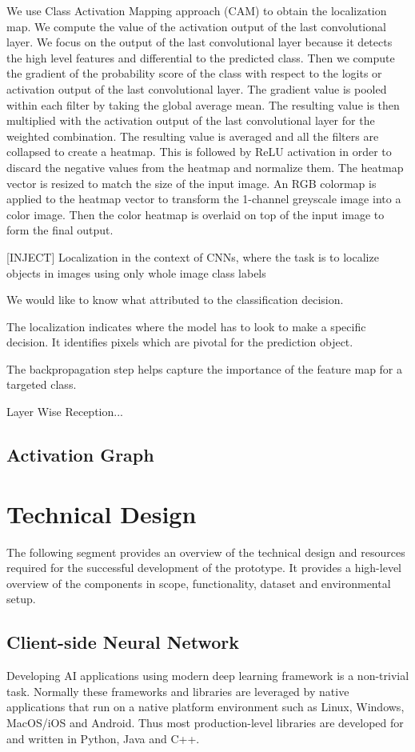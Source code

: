 We use Class Activation Mapping approach (CAM) to obtain the localization map. We compute the value of the activation output of the last convolutional layer. We focus on the output of the last convolutional layer because it detects the high level features and differential to the predicted class. Then we compute the gradient of the probability score of the class with respect to the logits or activation output of the last convolutional layer. The gradient value is pooled within each filter by taking the global average mean. The resulting value is then multiplied with the activation output of the last convolutional layer for the weighted combination. The resulting value is averaged and all the filters are collapsed to create a heatmap. This is followed by ReLU activation in order to discard the negative values from the heatmap and normalize them. The heatmap vector is resized to match the size of the input image. An RGB colormap is applied to the heatmap vector to transform the 1-channel greyscale image into a color image. Then the color heatmap is overlaid on top of the input image to form the final output.

[INJECT]
Localization in the context of CNNs, where the task is to localize objects in images using only whole image class labels

We would like to know what attributed to the classification decision.

The localization indicates where the model has to look to make a specific decision. It identifies pixels which are pivotal for the prediction object.

The backpropagation step helps capture the importance of the feature map for a targeted class.

Layer Wise Reception...

\subsection{Activation Graph}


\section{Technical Design}
The following segment provides an overview of the technical design and resources required for the successful development of the prototype. It provides a high-level overview of the components in scope, functionality, dataset and environmental setup.

\subsection{Client-side Neural Network}
Developing AI applications using modern deep learning framework is a non-trivial task. Normally these frameworks and libraries are leveraged by native applications that run on a native platform environment such as Linux, Windows, MacOS/iOS and Android. Thus most production-level libraries are developed for and written in Python, Java and C++. 

